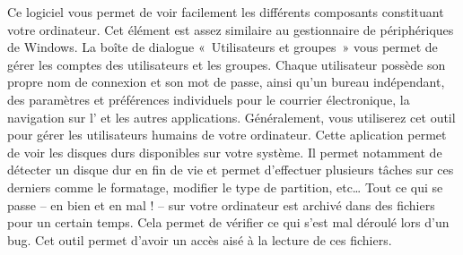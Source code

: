 Ce logiciel vous permet de voir facilement les différents composants constituant votre ordinateur. Cet élément est assez similaire au gestionnaire de périphériques de Windows.
La boîte de dialogue «~Utilisateurs et groupes~» vous permet de gérer les comptes des utilisateurs et les groupes. Chaque utilisateur possède son propre nom de connexion et son mot de passe, ainsi qu'un bureau indépendant, des paramètres et préférences individuels pour le courrier électronique, la navigation sur l' et les autres applications. Généralement, vous utiliserez cet outil pour gérer les utilisateurs humains de votre ordinateur.
Cette aplication permet de voir les disques durs disponibles sur votre système. Il permet notamment de détecter un disque dur en fin de vie et permet d'effectuer plusieurs tâches sur ces derniers comme le formatage, modifier le type de partition, etc\ldots{}
Tout ce qui se passe -- en bien et en mal ! -- sur votre ordinateur est archivé dans des fichiers  pour un certain temps. Cela permet de vérifier ce qui s'est mal déroulé lors d'un bug. Cet outil permet d'avoir un accès aisé à la lecture de ces fichiers.
